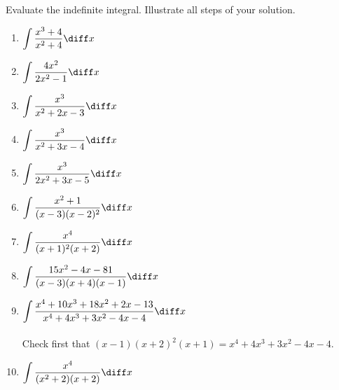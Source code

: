 Evaluate the indefinite integral. Illustrate all steps of your solution. 
\begin{multicols}{2}
\begin{enumerate}[ref={\fcProblemRef}]
\item $\displaystyle  \int \frac{x^3+4}{x^2+4}\diff x$

\item $\displaystyle\int \frac{4x^2 }{2x^2-1}\diff x$

\item $\displaystyle\int \frac{x^3}{x^2+2x-3}\diff x$

\item $\displaystyle\int \frac{x^3}{x^2+3x-4}\diff x$

\item $\displaystyle\int \frac{x^3 }{2x^2+3x-5}\diff x$ 

\item $\displaystyle \int \frac{x^2+1}{(x-3)(x-2)^2}\diff x$

\item $\displaystyle \int \frac{x^4 }{(x+1)^2(x+2) } \diff x$

\item $\displaystyle\int \frac{15x^2-4x-81}{ (x-3)(x +4)(x-1)}\diff x$

\item $\displaystyle \int \frac {x^{4}+10x^{3}+ 18x^{2} +2x - 13}{x^{4} +4x^{3} +3x^{2}- 4x-4} \diff x$ 
\\~\\

Check first that $(x-1)(x+2)^2(x+1)= x^{4}+4x^{3}+3x^{2}-4x-4$. 

\item $\displaystyle \int\frac{x^4 }{(x^2+2)(x+2) } \diff x$


\end{enumerate}
\end{multicols}
